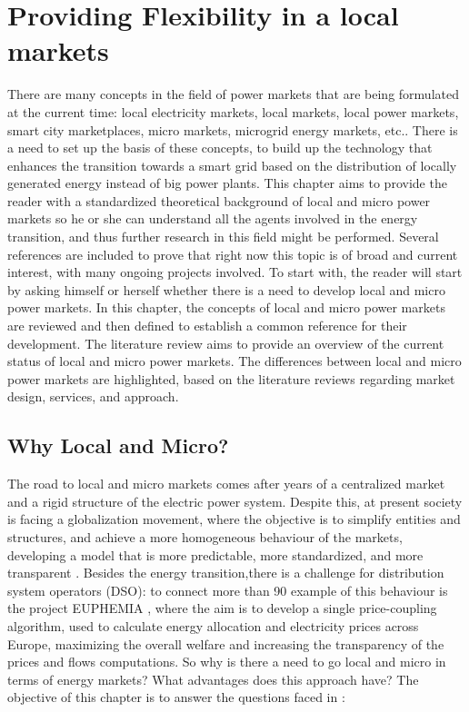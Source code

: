\renewcommand\labelenumi{(\roman{enumi})}
\renewcommand\theenumi\labelenumi

\chapter{Providing Flexibility in a local markets}
\label{chapterMarkets}

There are many concepts in the field of power markets that are being formulated at the current time: local electricity markets, local markets, local power markets, smart city marketplaces, micro markets, microgrid energy markets, etc.. There is a need to set up the basis of these concepts, to build up the technology that enhances the transition towards a smart grid based on the distribution of locally generated energy instead of big power plants.
This chapter aims to provide the reader with a standardized theoretical background of local and micro power markets so he or she can understand all the agents involved in the energy transition, and thus further research in this field might be performed. Several references are included to prove that right now this topic is of broad and current interest, with many ongoing projects involved.
To start with, the reader will start by asking himself or herself whether there is a need to develop local and micro power markets.
In this chapter, the concepts of local and micro power markets are reviewed and then defined to establish a common reference for their development. The literature review aims to provide an overview of the current status of local and micro power markets. The differences between local and micro power markets are highlighted, based on the literature reviews regarding market design, services, and approach.

\section{Why Local and Micro?}
The road to local and micro markets comes after years of a centralized market and a rigid structure of the electric power system. Despite this, at present society is facing a globalization movement, where the objective is to simplify entities and structures, and achieve a more homogeneous behaviour of the markets, developing a model that is more predictable, more standardized, and more transparent \cite{Mallet2014}. Besides the energy transition,there is a challenge for distribution system operators (DSO): to connect more than 90%
example of this behaviour is the project EUPHEMIA \cite{EUPHEMIA2016}, where the aim is to develop a single price-coupling algorithm, used to calculate energy allocation and electricity prices across Europe, maximizing the overall welfare and increasing the transparency of the prices and flows computations. So why is there a need to go local and micro in terms of energy markets? What advantages does this approach have? The objective of this chapter is to answer the questions faced in \cite{DesignElectricityMarketRossetoo2017}:

